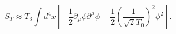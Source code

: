 \begin{equation}\label{disac}
S_{T}\approx T_{3}\int d^{4}x \left[-\frac{1}{2}\partial_{\mu}\phi
\partial^{\mu}\phi-\frac{1}{2}\left(\frac{1}{\sqrt{2}T_{0}}\right)^{2}
\phi^{2} \right].
\end{equation} 
